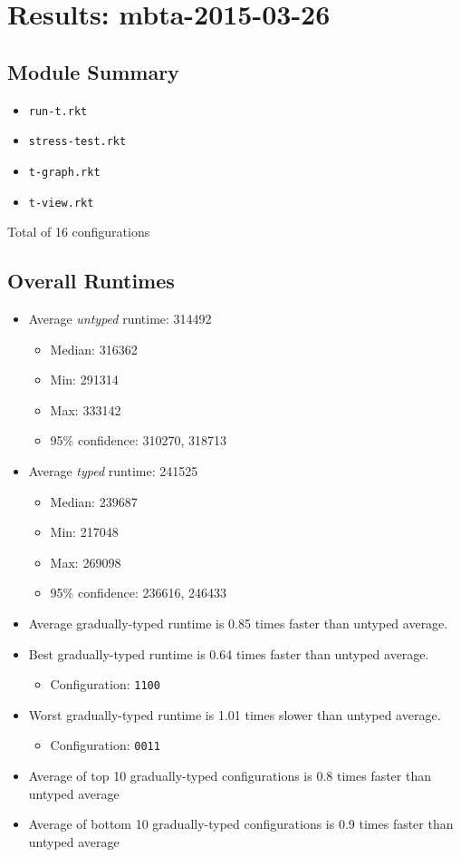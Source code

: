 \documentclass{article}
\newcommand{\mono}[1]{\texttt{#1}}
\begin{document}
\section{Results: mbta-2015-03-26}

\subsection{Module Summary}
\begin{itemize}
\item \mono{run-t.rkt}
\item \mono{stress-test.rkt}
\item \mono{t-graph.rkt}
\item \mono{t-view.rkt}\end{itemize}
Total of 16 configurations

\subsection{Overall Runtimes}
\begin{itemize}
\item Average \emph{untyped} runtime: 314492
  \begin{itemize}
  \item Median: 316362
  \item Min: 291314
  \item Max: 333142
  \item 95\% confidence: 310270, 318713
  \end{itemize}
\item Average \emph{typed} runtime: 241525
  \begin{itemize}
  \item Median: 239687
  \item Min: 217048
  \item Max: 269098
  \item 95\% confidence: 236616, 246433
  \end{itemize}
\item Average gradually-typed runtime is 0.85 times faster than untyped average.
\item Best gradually-typed runtime is 0.64 times faster than untyped average.
\begin{itemize}\item Configuration: \mono{1100}\end{itemize}
\item Worst gradually-typed runtime is 1.01 times slower than untyped average.
\begin{itemize}\item Configuration: \mono{0011}\end{itemize}
\item Average of top 10 gradually-typed configurations is 0.8 times faster than untyped average
\item Average of bottom 10 gradually-typed configurations is 0.9 times faster than untyped average
\end{itemize}
\end{document}

